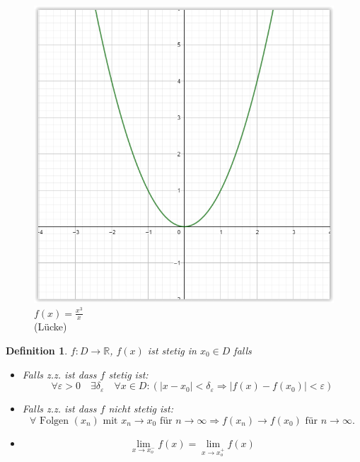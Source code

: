 \documentclass[12pt,a4paper]{article}%
\newtheorem{definition}[satz]{Definition}
\numberwithin{equation}{section}
\newcommand{\R}{\mathbb{R}} %
\numberwithin{equation}{subsection}
\begin{document}
  \begin{figure}[H] 
		\centering
	  \centering
	  \captionsetup{justification=centering}
	  \includegraphics[width=0.35\linewidth]{stetigkeit_luecke.png}
	  \caption{$f(x) = \frac{x^3}{x}$ \\ (Lücke)}
	  \label{fig:stetigkeit_luecke}
  \end{figure}
  \begin{definition}
    $f:D\rightarrow \R$, $f(x)$ ist stetig in $x_0 \in D$ falls \newline
    \begin{itemize}
      \item[1) ] Falls z.z. ist dass $f$ stetig ist:
      \begin{equation}
        \forall \varepsilon > 0 \quad \exists \delta_\varepsilon \quad \forall x \in D: \left(|x-x_0| < \delta_\varepsilon \Rightarrow |f(x) - f(x_0)| < \varepsilon \right)
      \end{equation}
      \item[2) ] Falls z.z. ist dass $f$ nicht stetig ist:
      \begin{equation}
        \forall \text{ Folgen } (x_n) \text{ mit }x_n \rightarrow x_0 \text{ für }n \rightarrow \infty \Rightarrow f(x_n) \rightarrow f(x_0) \text{ für } n \rightarrow \infty.
      \end{equation}
      \item[2) ] 
      \begin{equation}
        \lim\limits_{x \rightarrow x_o^-} f(x) = \lim\limits_{x \rightarrow x_o^+} f(x)
        \end{equation}
    \end{itemize}
  \end{definition}
\end{document}
